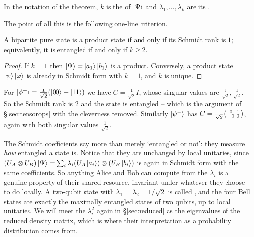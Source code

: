 \documentclass[a4paper]{scrartcl}
\begin{document}
\begin{definition}
	In the notation of the theorem, $k$ is the  of $\ket\Psi$ and $\lambda_1,\dots,\lambda_k$ are its .
\end{definition}

The point of all this is the following one-line criterion.

\begin{corollary}
	A bipartite pure state is a product state if and only if its Schmidt rank is $1$; equivalently, it is entangled if and only if $k\geq2$.
\end{corollary}

\begin{proof}
	If $k=1$ then $\ket\Psi = \ket{a_1}\ket{b_1}$ is a product. Conversely, a product state $\ket\psi\ket\varphi$ is already in Schmidt form with $k = 1$, and $k$ is unique.
\end{proof}

\begin{example}
	For $\ket{\phi^+} = \tfrac1{\sqrt2}(\ket{00}+\ket{11})$ we have $C = \tfrac1{\sqrt2}I$, whose singular values are $\tfrac1{\sqrt2},\tfrac1{\sqrt2}$. So the Schmidt rank is $2$ and the state is entangled -- which is the argument of \S\ref{sec:tensorops} with the cleverness removed. Similarly $\ket{\psi^-}$ has $C = \tfrac1{\sqrt2}\begin{psmallmatrix}0&1\\-1&0\end{psmallmatrix}$, again with both singular values $\tfrac1{\sqrt2}$.
\end{example}

The Schmidt coefficients say more than merely `entangled or not': they measure \emph{how} entangled a state is. Notice that they are unchanged by local unitaries, since $(U_A\otimes U_B)\ket\Psi = \sum_i\lambda_i(U_A\ket{a_i})\otimes(U_B\ket{b_i})$ is again in Schmidt form with the same coefficients. So anything Alice and Bob can compute from the $\lambda_i$ is a genuine property of their shared resource, invariant under whatever they choose to do locally. A two-qubit state with $\lambda_1 = \lambda_2 = 1/\sqrt2$ is called , and the four Bell states are exactly the maximally entangled states of two qubits, up to local unitaries. We will meet the $\lambda_i^2$ again in \S\ref{sec:reduced} as the eigenvalues of the reduced density matrix, which is where their interpretation as a probability distribution comes from.
\end{document}
